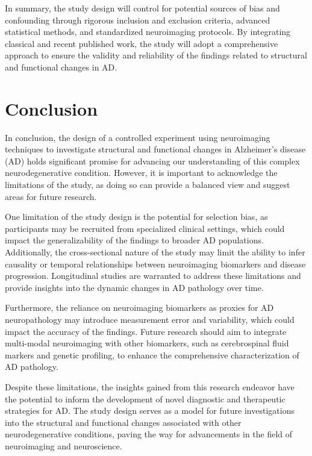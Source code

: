 \documentclass[10pt]{article}
\begin{document}
\begin{sloppypar}
  In summary, the study design will control for potential sources of bias and confounding through rigorous inclusion and exclusion criteria, advanced statistical methods, and standardized neuroimaging protocols. By integrating classical and recent published work, the study will adopt a comprehensive approach to ensure the validity and reliability of the findings related to structural and functional changes in AD.

  \section{Conclusion}
  \label{sec:conclusion}

  In conclusion, the design of a controlled experiment using neuroimaging techniques to investigate structural and functional changes in Alzheimer's disease (AD) holds significant promise for advancing our understanding of this complex neurodegenerative condition. However, it is important to acknowledge the limitations of the study, as doing so can provide a balanced view and suggest areas for future research.

  One limitation of the study design is the potential for selection bias, as participants may be recruited from specialized clinical settings, which could impact the generalizability of the findings to broader AD populations. Additionally, the cross-sectional nature of the study may limit the ability to infer causality or temporal relationships between neuroimaging biomarkers and disease progression. Longitudinal studies are warranted to address these limitations and provide insights into the dynamic changes in AD pathology over time.

  Furthermore, the reliance on neuroimaging biomarkers as proxies for AD neuropathology may introduce measurement error and variability, which could impact the accuracy of the findings. Future research should aim to integrate multi-modal neuroimaging with other biomarkers, such as cerebrospinal fluid markers and genetic profiling, to enhance the comprehensive characterization of AD pathology.

  Despite these limitations, the insights gained from this research endeavor have the potential to inform the development of novel diagnostic and therapeutic strategies for AD. The study design serves as a model for future investigations into the structural and functional changes associated with other neurodegenerative conditions, paving the way for advancements in the field of neuroimaging and neuroscience.


\end{sloppypar}
\end{document}
